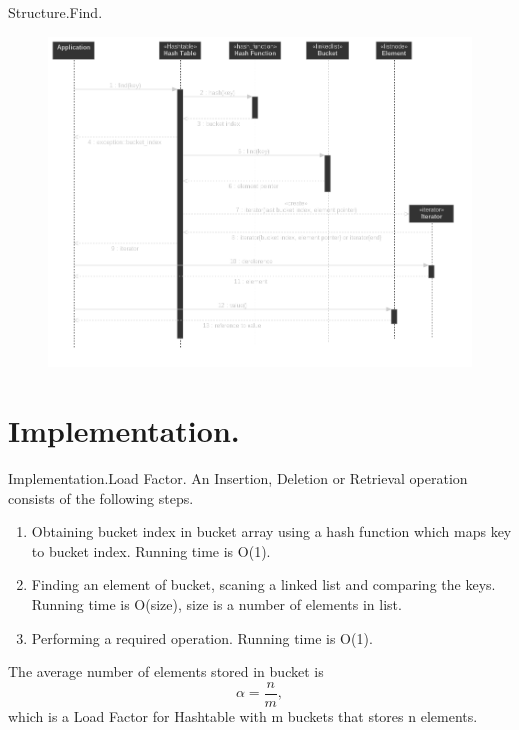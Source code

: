 \documentclass{beamer}
\begin{document}
\begin{frame}{Structure.}{Find.}
  \begin{figure}
    \includegraphics[scale=0.3]{pictures/structure_find_sequence}
  \end{figure}
\end{frame}





\section{Implementation.}

\begin{frame}{Implementation.}{Load Factor.}
  An Insertion, Deletion or Retrieval operation consists of the following steps.
  \begin{enumerate}
  \item Obtaining bucket index in bucket array using a hash function which maps key to bucket index.
    Running time is O(1).
  \item Finding an element of bucket, scaning a linked list and comparing the keys.
    Running time is O(size), size is a number of elements in list. 
    \item Performing a required operation. Running time is O(1).
  \end{enumerate}

  \par The average number of elements stored in bucket is
  \begin{equation}
    \alpha = \frac{n}{m},
  \end{equation}
  which is a Load Factor for Hashtable with m buckets that stores n elements.
\end{frame}
\end{document}
